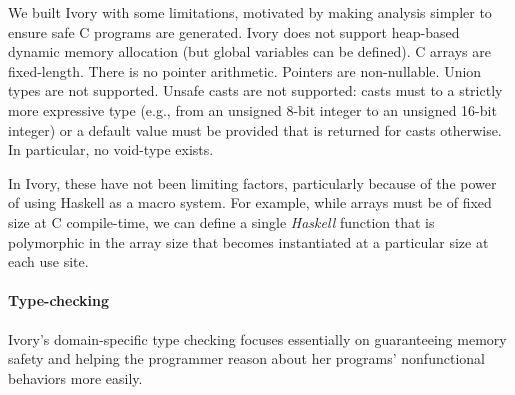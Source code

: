 We built Ivory with some limitations, motivated by making analysis simpler to
ensure safe C programs are generated.  Ivory does not support heap-based dynamic
memory allocation (but global variables can be defined).  C arrays are
fixed-length.  There is no pointer arithmetic.  Pointers are non-nullable.
Union types are not supported.  Unsafe casts are not supported: casts must to a
strictly more expressive type (e.g., from an unsigned 8-bit integer to an
unsigned 16-bit integer) or a default value must be provided that is returned
for casts otherwise.  In particular, no void-type exists.

In Ivory, these have not been limiting factors, particularly because of the
power of using Haskell as a macro system.  For example, while arrays must be of
fixed size at C compile-time, we can define a single \emph{Haskell} function
that is polymorphic in the array size that becomes instantiated at a particular
size at each use site.  %


\paragraph{Type-checking}
Ivory's domain-specific type checking focuses essentially on guaranteeing memory
safety and helping the programmer reason about her programs' nonfunctional
behaviors more easily.




